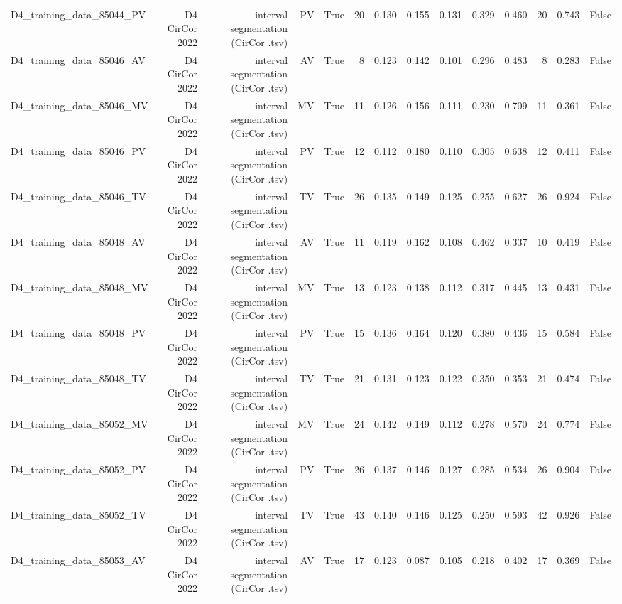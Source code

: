 \begin{table}[htbp]
\begin{tabular}{lrrrrrrrrrrrrr}
    D4\_training\_data\_85044\_PV & D4 CirCor 2022 & interval segmentation (CirCor .tsv) & PV & True & 20 & 0.130 & 0.155 & 0.131 & 0.329 & 0.460 & 20 & 0.743 & False \\
    D4\_training\_data\_85046\_AV & D4 CirCor 2022 & interval segmentation (CirCor .tsv) & AV & True & 8 & 0.123 & 0.142 & 0.101 & 0.296 & 0.483 & 8 & 0.283 & False \\
    D4\_training\_data\_85046\_MV & D4 CirCor 2022 & interval segmentation (CirCor .tsv) & MV & True & 11 & 0.126 & 0.156 & 0.111 & 0.230 & 0.709 & 11 & 0.361 & False \\
    D4\_training\_data\_85046\_PV & D4 CirCor 2022 & interval segmentation (CirCor .tsv) & PV & True & 12 & 0.112 & 0.180 & 0.110 & 0.305 & 0.638 & 12 & 0.411 & False \\
    D4\_training\_data\_85046\_TV & D4 CirCor 2022 & interval segmentation (CirCor .tsv) & TV & True & 26 & 0.135 & 0.149 & 0.125 & 0.255 & 0.627 & 26 & 0.924 & False \\
    D4\_training\_data\_85048\_AV & D4 CirCor 2022 & interval segmentation (CirCor .tsv) & AV & True & 11 & 0.119 & 0.162 & 0.108 & 0.462 & 0.337 & 10 & 0.419 & False \\
    D4\_training\_data\_85048\_MV & D4 CirCor 2022 & interval segmentation (CirCor .tsv) & MV & True & 13 & 0.123 & 0.138 & 0.112 & 0.317 & 0.445 & 13 & 0.431 & False \\
    D4\_training\_data\_85048\_PV & D4 CirCor 2022 & interval segmentation (CirCor .tsv) & PV & True & 15 & 0.136 & 0.164 & 0.120 & 0.380 & 0.436 & 15 & 0.584 & False \\
    D4\_training\_data\_85048\_TV & D4 CirCor 2022 & interval segmentation (CirCor .tsv) & TV & True & 21 & 0.131 & 0.123 & 0.122 & 0.350 & 0.353 & 21 & 0.474 & False \\
    D4\_training\_data\_85052\_MV & D4 CirCor 2022 & interval segmentation (CirCor .tsv) & MV & True & 24 & 0.142 & 0.149 & 0.112 & 0.278 & 0.570 & 24 & 0.774 & False \\
    D4\_training\_data\_85052\_PV & D4 CirCor 2022 & interval segmentation (CirCor .tsv) & PV & True & 26 & 0.137 & 0.146 & 0.127 & 0.285 & 0.534 & 26 & 0.904 & False \\
    D4\_training\_data\_85052\_TV & D4 CirCor 2022 & interval segmentation (CirCor .tsv) & TV & True & 43 & 0.140 & 0.146 & 0.125 & 0.250 & 0.593 & 42 & 0.926 & False \\
    D4\_training\_data\_85053\_AV & D4 CirCor 2022 & interval segmentation (CirCor .tsv) & AV & True & 17 & 0.123 & 0.087 & 0.105 & 0.218 & 0.402 & 17 & 0.369 & False \\

\end{tabular}
\end{table}
